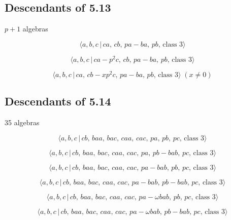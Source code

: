 \documentclass[10pt]{article}
\begin{document}
\subsection{Descendants of 5.13}

$p+1$ algebras

\begin{equation}
\langle a,b,c\,|\,ca,\,cb,\,pa-ba,\,pb,\,\text{class }3\rangle  \tag{6.228}
\end{equation}

\begin{equation}
\langle a,b,c\,|\,ca-p^2c,\,cb,\,pa-ba,\,pb,\,\text{class }3\rangle 
\tag{6.229}
\end{equation}

\begin{equation}
\langle a,b,c\,|\,ca,\,cb-xp^2c,\,pa-ba,\,pb,\,\text{class }3\rangle\;(x
\neq 0)  \tag{6.230}
\end{equation}

\subsection{Descendants of 5.14}

35 algebras

\begin{equation}
\langle a,b,c\,|\,cb,\,baa,\,bac,\,caa,\,cac,\,pa,\,pb,\,pc,\,\text{class }%
3\rangle  \tag{6.231}
\end{equation}

\begin{equation}
\langle a,b,c\,|\,cb,\,baa,\,bac,\,caa,\,cac,\,pa,\,pb-bab,\,pc,\,\text{
class }3\rangle  \tag{6.232}
\end{equation}

\begin{equation}
\langle a,b,c\,|\,cb,\,baa,\,bac,\,caa,\,cac,\,pa-bab,\,pb,\,pc,\,\text{
class }3\rangle  \tag{6.233}
\end{equation}

\begin{equation}
\langle a,b,c\,|\,cb,\,baa,\,bac,\,caa,\,cac,\,pa-bab,\,pb-bab,\,pc,\,\text{
class }3\rangle  \tag{6.234}
\end{equation}

\begin{equation}
\langle a,b,c\,|\,cb,\,baa,\,bac,\,caa,\,cac,\,pa-\omega bab,\,pb,\,pc,\,%
\text{class }3\rangle  \tag{6.235}
\end{equation}

\begin{equation}
\langle a,b,c\,|\,cb,\,baa,\,bac,\,caa,\,cac,\,pa-\omega bab,\,pb-bab,\,pc,\,%
\text{class }3\rangle  \tag{6.236}
\end{equation}
\end{document}
